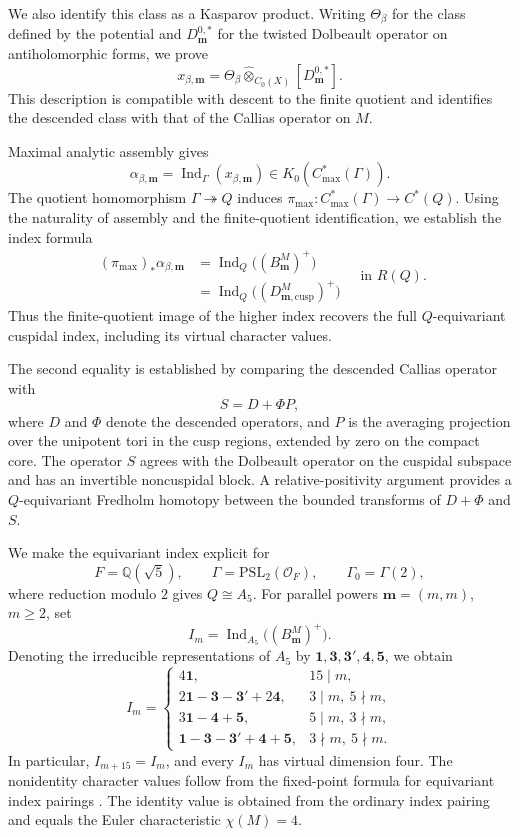 \documentclass[11pt]{article}
\theoremstyle{definition}
\theoremstyle{plain}
\numberwithin{equation}{section}
\newcommand{\cusp}{\mathrm{cusp}}
\newcommand{\Ind}{\operatorname{Ind}}
\begin{document}
We also identify this class as a Kasparov product.
Writing $\Theta_\beta$ for the class defined by the
potential and $D_{\boldsymbol m}^{0,*}$ for the
twisted Dolbeault operator on antiholomorphic forms,
we prove
\[
 x_{\beta,\boldsymbol m}
 =\Theta_\beta\widehat\otimes_{C_0(X)}
   [D_{\boldsymbol m}^{0,*}].
\]
This description is compatible with descent to the
finite quotient and identifies the descended class
with that of the Callias operator on $M$.

Maximal analytic assembly gives
\[
 \alpha_{\beta,\boldsymbol m}
 =\Ind_\Gamma(x_{\beta,\boldsymbol m})
 \in K_0(C^*_{\max}(\Gamma)).
\]
The quotient homomorphism
$\Gamma\twoheadrightarrow Q$ induces
$\pi_{\max}:C^*_{\max}(\Gamma)\to C^*(Q)$.
Using the naturality of assembly
\cite{HochsLandsman} and the finite-quotient
identification, we establish the index formula
\[
 \boxed{
 \begin{aligned}
 (\pi_{\max})_*\alpha_{\beta,\boldsymbol m}
 &=\Ind_Q\bigl((B_{\boldsymbol m}^M)^+\bigr)\\
 &=\Ind_Q\bigl(
       (D_{\boldsymbol m,\cusp}^M)^+\bigr)
 \end{aligned}}
 \quad\text{in }R(Q).
\]
Thus the finite-quotient image of the higher index
recovers the full $Q$-equivariant cuspidal index,
including its virtual character values.


The second equality is established by comparing
the descended Callias operator with
\[
 S=D+\Phi P,
\]
where $D$ and $\Phi$ denote the descended operators,
and $P$ is the averaging projection over the unipotent
tori in the cusp regions, extended by zero on the
compact core. The operator $S$ agrees with the
Dolbeault operator on the cuspidal subspace and
has an invertible noncuspidal block.
A relative-positivity argument \cite{vanDenDungen}
provides a $Q$-equivariant Fredholm homotopy
between the bounded transforms of $D+\Phi$ and $S$.

We make the equivariant index explicit for
\[
 F=\mathbb Q(\sqrt5),\qquad
 \Gamma=\mathrm{PSL}_2(\mathcal O_F),\qquad
 \Gamma_0=\Gamma(2),
\]
where reduction modulo $2$ gives
$Q\cong A_5$. For parallel powers
$\boldsymbol m=(m,m)$, $m\geq2$, set
\[
 I_m=\Ind_{A_5}
       \bigl((B_{\boldsymbol m}^M)^+\bigr).
\]
Denoting the irreducible representations of $A_5$
by $\mathbf1,\mathbf3,\mathbf3',\mathbf4,\mathbf5$,
we obtain
\[
 I_m=
 \begin{cases}
  4\mathbf1,
    &15\mid m,\\
  2\mathbf1-\mathbf3-\mathbf3'+2\mathbf4,
    &3\mid m,\ 5\nmid m,\\
  3\mathbf1-\mathbf4+\mathbf5,
    &5\mid m,\ 3\nmid m,\\
  \mathbf1-\mathbf3-\mathbf3'
   +\mathbf4+\mathbf5,
    &3\nmid m,\ 5\nmid m.
 \end{cases}
\]
In particular, $I_{m+15}=I_m$, and every $I_m$
has virtual dimension four. The nonidentity
character values follow from the fixed-point
formula for equivariant index pairings
\cite{HochsWang}. The identity value is obtained
from the ordinary index pairing and equals the
Euler characteristic $\chi(M)=4$.
\end{document}

